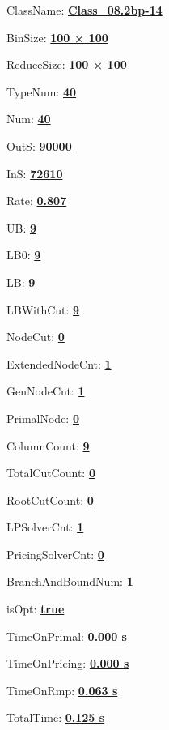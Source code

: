 \documentclass[11pt]{article}
\begin{document}
\pagestyle{empty}


ClassName: \underline{\textbf{Class_08.2bp-14}}
\par
BinSize: \underline{\textbf{100 × 100}}
\par
ReduceSize: \underline{\textbf{100 × 100}}
\par
TypeNum: \underline{\textbf{40}}
\par
Num: \underline{\textbf{40}}
\par
OutS: \underline{\textbf{90000}}
\par
InS: \underline{\textbf{72610}}
\par
Rate: \underline{\textbf{0.807}}
\par
UB: \underline{\textbf{9}}
\par
LB0: \underline{\textbf{9}}
\par
LB: \underline{\textbf{9}}
\par
LBWithCut: \underline{\textbf{9}}
\par
NodeCut: \underline{\textbf{0}}
\par
ExtendedNodeCnt: \underline{\textbf{1}}
\par
GenNodeCnt: \underline{\textbf{1}}
\par
PrimalNode: \underline{\textbf{0}}
\par
ColumnCount: \underline{\textbf{9}}
\par
TotalCutCount: \underline{\textbf{0}}
\par
RootCutCount: \underline{\textbf{0}}
\par
LPSolverCnt: \underline{\textbf{1}}
\par
PricingSolverCnt: \underline{\textbf{0}}
\par
BranchAndBoundNum: \underline{\textbf{1}}
\par
isOpt: \underline{\textbf{true}}
\par
TimeOnPrimal: \underline{\textbf{0.000 s}}
\par
TimeOnPricing: \underline{\textbf{0.000 s}}
\par
TimeOnRmp: \underline{\textbf{0.063 s}}
\par
TotalTime: \underline{\textbf{0.125 s}}
\par
\newpage


\end{document}
